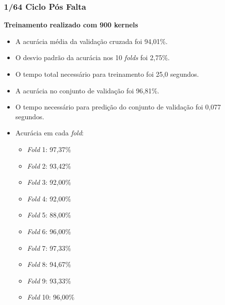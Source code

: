 \subsubsection{1/64 Ciclo Pós Falta}
\textbf{Treinamento realizado com 900 kernels}
\begin{itemize}
    \item A acurácia média da validação cruzada foi 94,01\%.
    \item O desvio padrão da acurácia nos 10 \textit{folds} foi 2,75\%.
    \item O tempo total necessário para treinamento foi 25,0 segundos.
    \item A acurácia no conjunto de validação foi 96,81\%.
    \item O tempo necessário para predição do conjunto de validação foi 0,077 segundos.
    \item Acurácia em cada \textit{fold}:
    \begin{itemize}
        \item \textit{Fold} 1: 97,37\%
        \item \textit{Fold} 2: 93,42\%
        \item \textit{Fold} 3: 92,00\%
        \item \textit{Fold} 4: 92,00\%
        \item \textit{Fold} 5: 88,00\%
        \item \textit{Fold} 6: 96,00\%
        \item \textit{Fold} 7: 97,33\%
        \item \textit{Fold} 8: 94,67\%
        \item \textit{Fold} 9: 93,33\%
        \item \textit{Fold} 10: 96,00\%
    \end{itemize}
\end{itemize}

